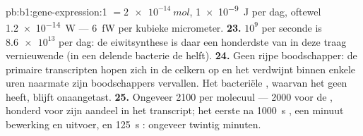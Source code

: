 \begin{solution}{pb:b1:gene-expression:1}
$= \qty{2e-14}{mol}$, \qty{1e-9}{J} per dag, oftewel \qty{1.2e-14}{W} ---
\qty{6}{fW} per kubieke micrometer.
\textbf{23.} $10^9$  per seconde is $\num{8.6e13}$ per dag: de eiwitsynthese is
daar een honderdste van in deze traag vernieuwende  (in een delende bacterie de
helft).
\textbf{24.} Geen rijpe boodschapper: de primaire transcripten hopen zich in de
celkern op en het  verdwijnt binnen enkele uren naarmate zijn boodschappers
vervallen. Het bacteriële , waarvan het  geen  heeft, blijft
onaangetast.
\textbf{25.} Ongeveer 2100  per molecuul --- 2000 voor de , honderd
voor zijn aandeel in het transcript; het eerste  na \qty{1000}{s} ,
een minuut bewerking en uitvoer, en \qty{125}{s} : ongeveer twintig
minuten.
\end{solution}
